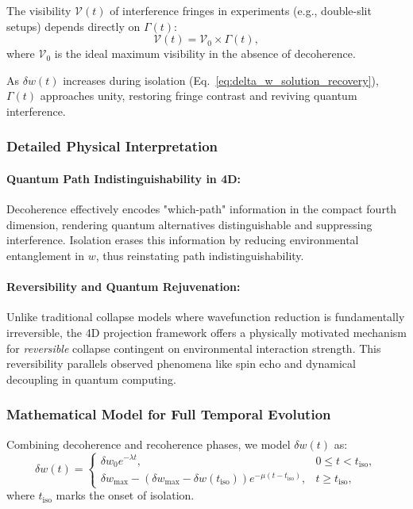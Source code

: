 \documentclass[12pt]{article}
\begin{document}
The visibility \(\mathcal{V}(t)\) of interference fringes in experiments (e.g., double-slit setups) depends directly on \(\Gamma(t)\):
\begin{equation}
\mathcal{V}(t) = \mathcal{V}_0 \times \Gamma(t),
\label{eq:visibility_expression}
\end{equation}
where \(\mathcal{V}_0\) is the ideal maximum visibility in the absence of decoherence.

As \(\delta w(t)\) increases during isolation (Eq.~\eqref{eq:delta_w_solution_recovery}), \(\Gamma(t)\) approaches unity, restoring fringe contrast and reviving quantum interference.

\subsubsection*{Detailed Physical Interpretation}

\paragraph{Quantum Path Indistinguishability in 4D:} Decoherence effectively encodes "which-path" information in the compact fourth dimension, rendering quantum alternatives distinguishable and suppressing interference. Isolation erases this information by reducing environmental entanglement in \(w\), thus reinstating path indistinguishability.

\paragraph{Reversibility and Quantum Rejuvenation:} Unlike traditional collapse models where wavefunction reduction is fundamentally irreversible, the 4D projection framework offers a physically motivated mechanism for \emph{reversible} collapse contingent on environmental interaction strength. This reversibility parallels observed phenomena like spin echo and dynamical decoupling in quantum computing.

\subsubsection*{Mathematical Model for Full Temporal Evolution}

Combining decoherence and recoherence phases, we model \(\delta w(t)\) as:
\begin{equation}
\delta w(t) =
\begin{cases}
\delta w_0 e^{-\lambda t}, & 0 \leq t < t_{\mathrm{iso}}, \\
\delta w_{\max} - \left( \delta w_{\max} - \delta w(t_{\mathrm{iso}}) \right) e^{-\mu (t - t_{\mathrm{iso}})}, & t \geq t_{\mathrm{iso}},
\end{cases}
\label{eq:full_coherence_dynamics}
\end{equation}
where \(t_{\mathrm{iso}}\) marks the onset of isolation.
\end{document}

